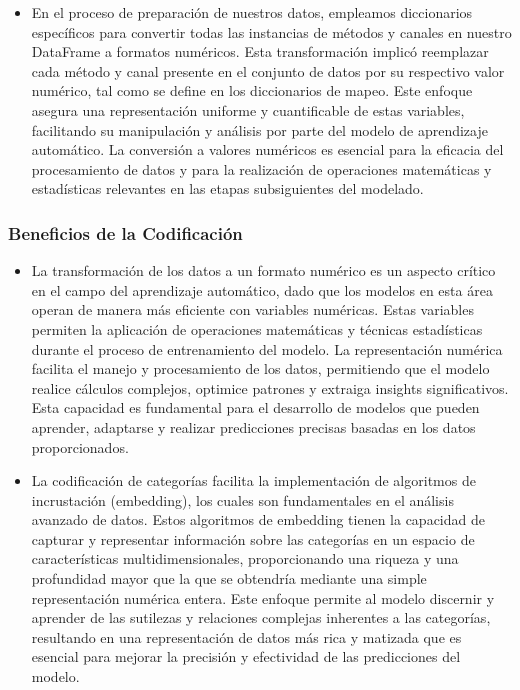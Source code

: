 \begin{itemize}
    \item En el proceso de preparación de nuestros datos, empleamos diccionarios específicos para convertir todas las instancias de métodos y canales en nuestro DataFrame a formatos numéricos. Esta transformación implicó reemplazar cada método y canal presente en el conjunto de datos por su respectivo valor numérico, tal como se define en los diccionarios de mapeo. Este enfoque asegura una representación uniforme y cuantificable de estas variables, facilitando su manipulación y análisis por parte del modelo de aprendizaje automático. La conversión a valores numéricos es esencial para la eficacia del procesamiento de datos y para la realización de operaciones matemáticas y estadísticas relevantes en las etapas subsiguientes del modelado.
\end{itemize}

\subsubsection{Beneficios de la Codificación}

\begin{itemize}
    \item La transformación de los datos a un formato numérico es un aspecto crítico en el campo del aprendizaje automático, dado que los modelos en esta área operan de manera más eficiente con variables numéricas. Estas variables permiten la aplicación de operaciones matemáticas y técnicas estadísticas durante el proceso de entrenamiento del modelo. La representación numérica facilita el manejo y procesamiento de los datos, permitiendo que el modelo realice cálculos complejos, optimice patrones y extraiga insights significativos. Esta capacidad es fundamental para el desarrollo de modelos que pueden aprender, adaptarse y realizar predicciones precisas basadas en los datos proporcionados.
    \item La codificación de categorías facilita la implementación de algoritmos de incrustación (embedding), los cuales son fundamentales en el análisis avanzado de datos. Estos algoritmos de embedding tienen la capacidad de capturar y representar información sobre las categorías en un espacio de características multidimensionales, proporcionando una riqueza y una profundidad mayor que la que se obtendría mediante una simple representación numérica entera. Este enfoque permite al modelo discernir y aprender de las sutilezas y relaciones complejas inherentes a las categorías, resultando en una representación de datos más rica y matizada que es esencial para mejorar la precisión y efectividad de las predicciones del modelo.
\end{itemize}

